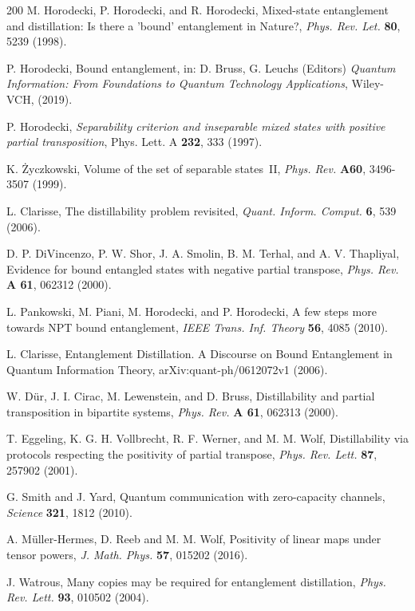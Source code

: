 \documentclass[english,aps,pra,nofootinbib,twocolumn,superscriptaddress]{revtex4-1}
\newcommand{\1}{{\rm 1\hspace{-0.9mm}l}}
\begin{document}
\begin{thebibliography}{200}
  M. Horodecki, P. Horodecki, and R. Horodecki,
Mixed-state entanglement and distillation: Is there a 'bound' entanglement 
in Nature?, {\sl Phys. Rev. Let.} {\bf  80}, 5239 (1998).

P. Horodecki, Bound entanglement, in: D. Bruss, G. Leuchs (Editors)
{\sl Quantum Information: From Foundations to Quantum Technology Applications}, 
Wiley-VCH, (2019). 

 P. Horodecki, {\sl Separability criterion and inseparable mixed states with positive partial transposition}, Phys. Lett. A {\bf 232}, 333 (1997).


  K. {\.Z}yczkowski,  Volume of the set of separable states~II, 
{\sl Phys. Rev.} {\bf A60}, 3496-3507 (1999).
 
 L. Clarisse, The distillability problem revisited, 
{\sl Quant. Inform. Comput.} {\bf  6}, 539 (2006).


 D. P. DiVincenzo, P. W. Shor, J. A. Smolin, B. M. Terhal, and A. V. Thapliyal, 
Evidence for bound entangled states with negative partial transpose, 
{\sl Phys. Rev.} {\bf  A 61}, 062312 (2000).

L. Pankowski, M. Piani, M. Horodecki, and P. Horodecki, A few steps more towards NPT bound entanglement,
{\sl   IEEE Trans. Inf. Theory} {\bf  56},  4085 (2010).

 L. Clarisse, 
Entanglement Distillation. 
A Discourse on Bound Entanglement in Quantum Information Theory, 
arXiv:quant-ph/0612072v1 (2006).

 W. D{\"u}r, J. I. Cirac, M. Lewenstein, and D. Bruss, 
Distillability and partial transposition in bipartite systems, 
{\sl Phys. Rev.} {\bf  A 61}, 062313 (2000).

 T. Eggeling, K. G. H. Vollbrecht, R. F. Werner, and M. M. Wolf, 
Distillability via protocols respecting the positivity of partial transpose,
{\sl  Phys. Rev. Lett.} {\bf 87}, 257902  (2001).

 G. Smith and J. Yard, 
Quantum communication with zero-capacity channels, 
{\it Science} {\bf 321}, 1812 (2010).
 
 A. M{\"u}ller-Hermes, D. Reeb and M. M. Wolf,
   Positivity of linear maps under tensor powers,  
  {\sl J. Math. Phys.} {\bf 57}, 015202 (2016).

J. Watrous, Many copies may be required for entanglement distillation, 
{\sl Phys. Rev. Lett.} {\bf  93}, 010502 (2004).


\end{thebibliography}
\end{document}
